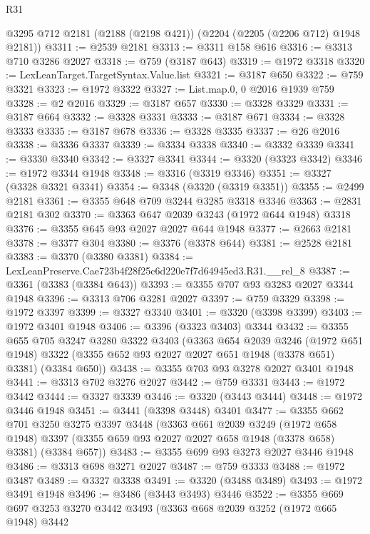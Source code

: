 \begin{lexlean}{R31}
\begin{coremodule}
    @3295
    @712
    @2181
    (@2188 (@2198 @421))
    (@2204 (@2205 (@2206 @712) @1948 @2181))
@3311 := @2539 @2181
@3313 := @3311 @158 @616
@3316 := @3313 @710 @3286 @2027
@3318 := @759 (@3187 @643)
@3319 := @1972 @3318
@3320 := LexLeanTarget.TargetSyntax.Value.list
@3321 := @3187 @650
@3322 := @759 @3321
@3323 := @1972 @3322
@3327 := List.map.{0, 0} @2016 @1939 @759
@3328 := @2 @2016
@3329 := @3187 @657
@3330 := @3328 @3329
@3331 := @3187 @664
@3332 := @3328 @3331
@3333 := @3187 @671
@3334 := @3328 @3333
@3335 := @3187 @678
@3336 := @3328 @3335
@3337 := @26 @2016
@3338 := @3336 @3337
@3339 := @3334 @3338
@3340 := @3332 @3339
@3341 := @3330 @3340
@3342 := @3327 @3341
@3344 := @3320 (@3323 @3342)
@3346 := @1972 @3344 @1948
@3348 := @3316 (@3319 @3346)
@3351 := @3327 (@3328 @3321 @3341)
@3354 := @3348 (@3320 (@3319 @3351))
@3355 := @2499 @2181
@3361 := @3355 @648 @709 @3244 @3285 @3318 @3346
@3363 := @2831 @2181 @302
@3370 := @3363 @647 @2039 @3243 (@1972 @644 @1948) @3318
@3376 := @3355 @645 @93 @2027 @2027 @644 @1948
@3377 := @2663 @2181
@3378 := @3377 @304
@3380 := @3376 (@3378 @644)
@3381 := @2528 @2181
@3383 := @3370 (@3380 @3381)
@3384 := LexLeanPreserve.Cae723b4f28f25c6d220e7f7d64945ed3.R31.__rel_8
@3387 := @3361 (@3383 (@3384 @643))
@3393 := @3355 @707 @93 @3283 @2027 @3344 @1948
@3396 := @3313 @706 @3281 @2027
@3397 := @759 @3329
@3398 := @1972 @3397
@3399 := @3327 @3340
@3401 := @3320 (@3398 @3399)
@3403 := @1972 @3401 @1948
@3406 := @3396 (@3323 @3403) @3344
@3432 := @3355
    @655
    @705
    @3247
    @3280
    @3322
    @3403
    (@3363
      @654
      @2039
      @3246
      (@1972 @651 @1948)
      @3322
      (@3355 @652 @93 @2027 @2027 @651 @1948 (@3378 @651) @3381)
      (@3384 @650))
@3438 := @3355 @703 @93 @3278 @2027 @3401 @1948
@3441 := @3313 @702 @3276 @2027
@3442 := @759 @3331
@3443 := @1972 @3442
@3444 := @3327 @3339
@3446 := @3320 (@3443 @3444)
@3448 := @1972 @3446 @1948
@3451 := @3441 (@3398 @3448) @3401
@3477 := @3355
    @662
    @701
    @3250
    @3275
    @3397
    @3448
    (@3363
      @661
      @2039
      @3249
      (@1972 @658 @1948)
      @3397
      (@3355 @659 @93 @2027 @2027 @658 @1948 (@3378 @658) @3381)
      (@3384 @657))
@3483 := @3355 @699 @93 @3273 @2027 @3446 @1948
@3486 := @3313 @698 @3271 @2027
@3487 := @759 @3333
@3488 := @1972 @3487
@3489 := @3327 @3338
@3491 := @3320 (@3488 @3489)
@3493 := @1972 @3491 @1948
@3496 := @3486 (@3443 @3493) @3446
@3522 := @3355
    @669
    @697
    @3253
    @3270
    @3442
    @3493
    (@3363
      @668
      @2039
      @3252
      (@1972 @665 @1948)
      @3442

\end{coremodule}
\end{lexlean}
